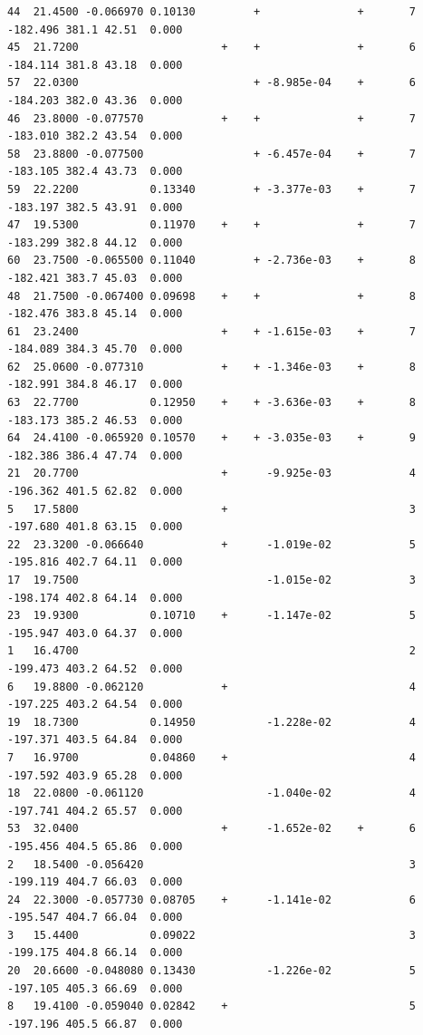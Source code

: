 \documentclass[
  oneside]{krantz}
\begin{document}
\begin{verbatim}
44  21.4500 -0.066970 0.10130         +               +       7 -182.496 381.1 42.51  0.000
45  21.7200                      +    +               +       6 -184.114 381.8 43.18  0.000
57  22.0300                           + -8.985e-04    +       6 -184.203 382.0 43.36  0.000
46  23.8000 -0.077570            +    +               +       7 -183.010 382.2 43.54  0.000
58  23.8800 -0.077500                 + -6.457e-04    +       7 -183.105 382.4 43.73  0.000
59  22.2200           0.13340         + -3.377e-03    +       7 -183.197 382.5 43.91  0.000
47  19.5300           0.11970    +    +               +       7 -183.299 382.8 44.12  0.000
60  23.7500 -0.065500 0.11040         + -2.736e-03    +       8 -182.421 383.7 45.03  0.000
48  21.7500 -0.067400 0.09698    +    +               +       8 -182.476 383.8 45.14  0.000
61  23.2400                      +    + -1.615e-03    +       7 -184.089 384.3 45.70  0.000
62  25.0600 -0.077310            +    + -1.346e-03    +       8 -182.991 384.8 46.17  0.000
63  22.7700           0.12950    +    + -3.636e-03    +       8 -183.173 385.2 46.53  0.000
64  24.4100 -0.065920 0.10570    +    + -3.035e-03    +       9 -182.386 386.4 47.74  0.000
21  20.7700                      +      -9.925e-03            4 -196.362 401.5 62.82  0.000
5   17.5800                      +                            3 -197.680 401.8 63.15  0.000
22  23.3200 -0.066640            +      -1.019e-02            5 -195.816 402.7 64.11  0.000
17  19.7500                             -1.015e-02            3 -198.174 402.8 64.14  0.000
23  19.9300           0.10710    +      -1.147e-02            5 -195.947 403.0 64.37  0.000
1   16.4700                                                   2 -199.473 403.2 64.52  0.000
6   19.8800 -0.062120            +                            4 -197.225 403.2 64.54  0.000
19  18.7300           0.14950           -1.228e-02            4 -197.371 403.5 64.84  0.000
7   16.9700           0.04860    +                            4 -197.592 403.9 65.28  0.000
18  22.0800 -0.061120                   -1.040e-02            4 -197.741 404.2 65.57  0.000
53  32.0400                      +      -1.652e-02    +       6 -195.456 404.5 65.86  0.000
2   18.5400 -0.056420                                         3 -199.119 404.7 66.03  0.000
24  22.3000 -0.057730 0.08705    +      -1.141e-02            6 -195.547 404.7 66.04  0.000
3   15.4400           0.09022                                 3 -199.175 404.8 66.14  0.000
20  20.6600 -0.048080 0.13430           -1.226e-02            5 -197.105 405.3 66.69  0.000
8   19.4100 -0.059040 0.02842    +                            5 -197.196 405.5 66.87  0.000

\end{verbatim}
\end{document}
